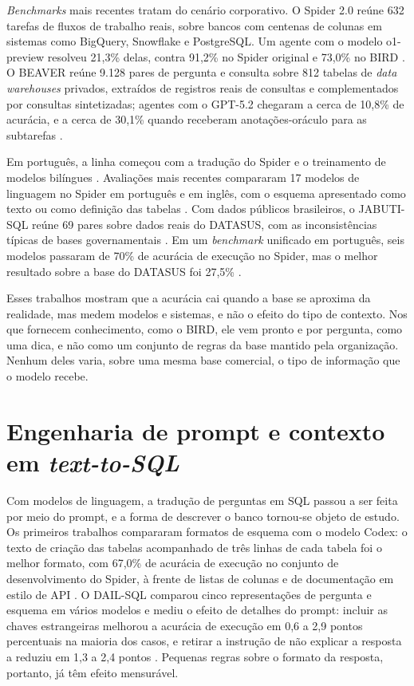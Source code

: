 \textit{Benchmarks} mais recentes tratam do cenário corporativo. O Spider
2.0 reúne 632 tarefas de fluxos de trabalho reais, sobre bancos com
centenas de colunas em sistemas como BigQuery, Snowflake e PostgreSQL. Um
agente com o modelo o1-preview resolveu 21,3\% delas, contra 91,2\% no
Spider original e 73,0\% no BIRD \cite{lei2025spider2}. O BEAVER reúne
9.128 pares de pergunta e consulta sobre 812 tabelas de \textit{data
warehouses} privados, extraídos de registros reais de consultas e
complementados por consultas sintetizadas; agentes com o GPT-5.2 chegaram
a cerca de 10,8\% de acurácia, e a cerca de 30,1\% quando receberam
anotações-oráculo para as subtarefas \cite{chen2024beaver}.

Em português, a linha começou com a tradução do Spider e o treinamento de
modelos bilíngues \cite{jose2021mrat}. Avaliações mais recentes compararam
17 modelos de linguagem no Spider em português e em inglês, com o esquema
apresentado como texto ou como definição das tabelas
\cite{carvalho2025benchmarking}. Com dados públicos brasileiros, o
JABUTI-SQL reúne 69 pares sobre dados reais do DATASUS, com as
inconsistências típicas de bases governamentais \cite{botelho2026jabuti}.
Em um \textit{benchmark} unificado em português, seis modelos passaram de
70\% de acurácia de execução no Spider, mas o melhor resultado sobre a
base do DATASUS foi 27,5\% \cite{fonseca2026avaliacao}.

Esses trabalhos mostram que a acurácia cai quando a base se aproxima da
realidade, mas medem modelos e sistemas, e não o efeito do tipo de
contexto. Nos que fornecem conhecimento, como o BIRD, ele vem pronto e por
pergunta, como uma dica, e não como um conjunto de regras da base mantido
pela organização. Nenhum deles varia, sobre uma mesma base comercial, o
tipo de informação que o modelo recebe.

\section{Engenharia de prompt e contexto em \textit{text-to-SQL}}
\label{sec:contexto-externo}

Com modelos de linguagem, a tradução de perguntas em SQL passou a ser
feita por meio do prompt, e a forma de descrever o banco tornou-se objeto
de estudo. Os primeiros trabalhos compararam formatos de esquema com o
modelo Codex: o texto de criação das tabelas acompanhado de três linhas de
cada tabela foi o melhor formato, com 67,0\% de acurácia de execução no
conjunto de desenvolvimento do Spider, à frente de listas de colunas e de
documentação em estilo de API \cite{rajkumar2022evaluating}. O DAIL-SQL
comparou cinco representações de pergunta e esquema em vários modelos e
mediu o efeito de detalhes do prompt: incluir as chaves estrangeiras
melhorou a acurácia de execução em 0,6 a 2,9 pontos percentuais na
maioria dos casos, e retirar a instrução de não explicar a resposta a
reduziu em 1,3 a 2,4 pontos \cite{gao2024dail}. Pequenas regras sobre o
formato da resposta, portanto, já têm efeito mensurável.

